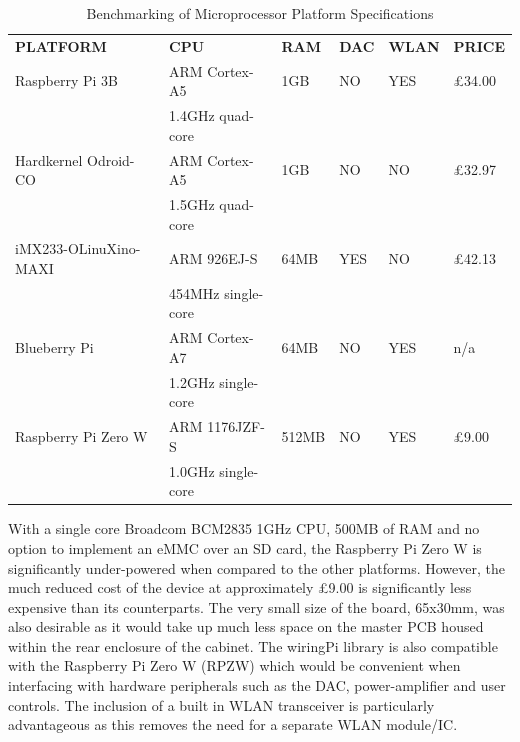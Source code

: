 \documentclass[main.tex]{subfiles}
\begin{document}
\begin{table}[H]
    \centering  
    \caption{Benchmarking of Microprocessor Platform Specifications}
    \begin{tabu} to 0.8\textwidth { | l | l | l | l | l | l | }
        \hline
        \textbf{PLATFORM} &  \textbf{CPU} & \textbf{RAM} & \textbf{DAC} & \textbf{WLAN} & \textbf{PRICE}  \\
        \hhline{|=|=|=|=|=|=|}
        Raspberry Pi 3B\cite{rpiB} & ARM Cortex-A5 & 1GB & NO & YES & £34.00 \\
        & 1.4GHz quad-core & & & & \\
        \hline
        Hardkernel Odroid-CO\cite{odroid} & ARM Cortex-A5 & 1GB & NO & NO & £32.97 \\
        & 1.5GHz quad-core & & & & \\
        \hline
        iMX233-OLinuXino-MAXI\cite{olimex} & ARM 926EJ-S & 64MB & YES & NO & £42.13 \\
        & 454MHz single-core & & & & \\
        \hline
        Blueberry Pi\cite{blueberrypi} & ARM Cortex-A7 & 64MB & NO & YES & n/a \\
        & 1.2GHz single-core & & & & \\
        \hline
        Raspberry Pi Zero W\cite{rpi} & ARM 1176JZF-S & 512MB & NO & YES & £9.00 \\
        & 1.0GHz single-core & & & & \\
        \hline
        
        
    \end{tabu}
    
    \label{table:HWPlatforms}
    \end{table}

\medskip

\medskip
With a single core Broadcom BCM2835 1GHz CPU, 500MB of RAM and no option to implement an eMMC over an SD card, the Raspberry Pi Zero W is significantly under-powered when compared to the other platforms. 
However, the much reduced cost of the device at approximately £9.00\cite{RpiPrice} is significantly less expensive than its counterparts. The very small size of the board, 65x30mm, was also desirable as it would take up much less space on the master PCB housed within the rear enclosure of the cabinet. 
The wiringPi library is also compatible with the Raspberry Pi Zero W (RPZW) which would be convenient when interfacing with hardware peripherals such as the DAC, power-amplifier and user controls. The inclusion of a built in WLAN transceiver is particularly advantageous as this removes the need for a separate WLAN module/IC. 
\end{document}
